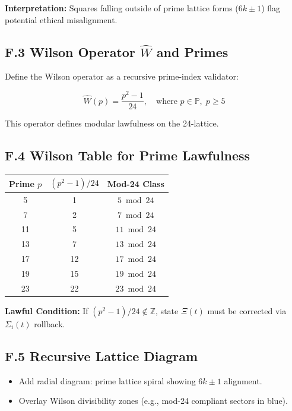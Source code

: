 \documentclass[12]{amsart}
\theoremstyle{plain}
\begin{document}
\noindent
\textbf{Interpretation:} Squares falling outside of prime lattice forms ($6k \pm 1$) flag potential ethical misalignment.

\subsection*{F.3 Wilson Operator $\hat{W}$ and Primes}

Define the Wilson operator as a recursive prime-index validator:

\begin{equation}
\hat{W}(p) = \frac{p^2 - 1}{24}, \quad \text{where } p \in \mathbb{P}, \; p \geq 5
\end{equation}

\noindent
This operator defines modular lawfulness on the 24-lattice.

\subsection*{F.4 Wilson Table for Prime Lawfulness}

\begin{center}
\begin{tabular}{c|c|c}
Prime $p$ & $(p^2 - 1)/24$ & Mod-24 Class \\
\hline
5 & 1 & $5 \bmod 24$ \\
7 & 2 & $7 \bmod 24$ \\
11 & 5 & $11 \bmod 24$ \\
13 & 7 & $13 \bmod 24$ \\
17 & 12 & $17 \bmod 24$ \\
19 & 15 & $19 \bmod 24$ \\
23 & 22 & $23 \bmod 24$ \\
\end{tabular}
\end{center}

\noindent
\textbf{Lawful Condition:} If $(p^2 - 1)/24 \notin \mathbb{Z}$, state $\Xi(t)$ must be corrected via $\Sigma_i(t)$ rollback.

\subsection*{F.5 Recursive Lattice Diagram}

\begin{itemize}
    \item Add radial diagram: prime lattice spiral showing $6k \pm 1$ alignment.
    \item Overlay Wilson divisibility zones (e.g., mod-24 compliant sectors in blue).
\end{itemize}
\end{document}
